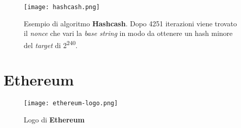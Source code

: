     \begin{figure}[h!]
        \centering
        \hspace*{-3cm}
        \texttt{[image: hashcash.png]}
        \caption[Esempio di algoritmo Hashcash]{Esempio di algoritmo \textbf{Hashcash}. Dopo 4251 iterazioni viene trovato il \textit{nonce} che vari la \textit{base string} in modo da ottenere un hash minore del \textit{target} di 2\textsuperscript{240}.}
        \label{img:hashcash}
    \end{figure}

\newpage

\section{Ethereum}

\begin{figure}[h!]
    \centering
    \texttt{[image: ethereum-logo.png]}
    \caption{Logo di \textbf{Ethereum}}
\end{figure}


